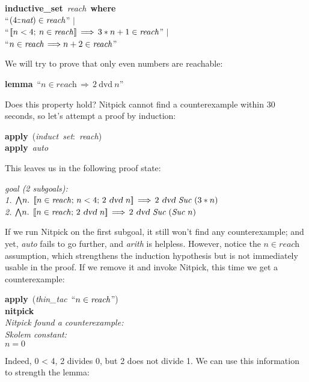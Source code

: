 \documentclass[a4paper,12pt]{article}
\def\Colon{\mathord{:\mkern-1.5mu:}}
\begin{document}
\prew
\textbf{inductive\_set}~\textit{reach}~\textbf{where} \\
``$(4\Colon\textit{nat}) \in \textit{reach\/}$'' $\mid$ \\
``$\mathopen{[\![} n < 4;\> n \in \textit{reach\/}\mathclose{]\!]} \,\Longrightarrow\, 3 * n + 1 \in \textit{reach\/}$'' $\mid$ \\
``$n \in \textit{reach} \,\Longrightarrow n + 2 \in \textit{reach\/}$''
\postw

We will try to prove that only even numbers are reachable:

\prew
\textbf{lemma}~``$n \in \textit{reach} \,\Longrightarrow\, 2~\textrm{dvd}~n$''
\postw

Does this property hold? Nitpick cannot find a counterexample within 30 seconds,
so let's attempt a proof by induction:

\prew
\textbf{apply}~(\textit{induct~set}{:}~\textit{reach\/}) \\
\textbf{apply}~\textit{auto}
\postw

This leaves us in the following proof state:

\prew
{\slshape goal (2 subgoals): \\
\phantom{0}1. ${\bigwedge}n.\;\, \mathopen{[\![} n \in \textit{reach\/};\, n < 4;\, 2~\textsl{dvd}~n\mathclose{]\!]} \,\Longrightarrow\, 2~\textsl{dvd}~\textit{Suc}~(3 * n)$ \\
\phantom{0}2. ${\bigwedge}n.\;\, \mathopen{[\![} n \in \textit{reach\/};\, 2~\textsl{dvd}~n\mathclose{]\!]} \,\Longrightarrow\, 2~\textsl{dvd}~\textit{Suc}~(\textit{Suc}~n)$
}
\postw

If we run Nitpick on the first subgoal, it still won't find any
counterexample; and yet, \textit{auto} fails to go further, and \textit{arith}
is helpless. However, notice the $n \in \textit{reach}$ assumption, which
strengthens the induction hypothesis but is not immediately usable in the proof.
If we remove it and invoke Nitpick, this time we get a counterexample:

\prew
\textbf{apply}~(\textit{thin\_tac}~``$n \in \textit{reach\/}$'') \\
\textbf{nitpick} \\[2\smallskipamount]
\slshape Nitpick found a counterexample: \\[2\smallskipamount]
\hbox{}\qquad Skolem constant: \nopagebreak \\
\hbox{}\qquad\qquad $n = 0$
\postw

Indeed, 0 < 4, 2 divides 0, but 2 does not divide 1. We can use this information
to strength the lemma:
\end{document}
